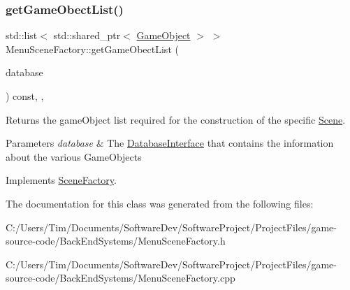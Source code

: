 \subsubsection{\texorpdfstring{get\+Game\+Obect\+List()}{getGameObectList()}}
{\footnotesize\ttfamily std\+::list$<$ std\+::shared\+\_\+ptr$<$ \hyperlink{class_game_object}{Game\+Object} $>$ $>$ Menu\+Scene\+Factory\+::get\+Game\+Obect\+List (\begin{DoxyParamCaption}\item[{std\+::shared\+\_\+ptr$<$ \hyperlink{class_database_interface}{Database\+Interface} $>$}]{database }\end{DoxyParamCaption}) const\hspace{0.3cm}{\ttfamily [final]}, {\ttfamily [protected]}, {\ttfamily [virtual]}}



Returns the game\+Object list required for the construction of the specific \hyperlink{class_scene}{Scene}. 


\begin{DoxyParams}{Parameters}
{\em database} & The \hyperlink{class_database_interface}{Database\+Interface} that contains the information about the various Game\+Objects \\
\hline
\end{DoxyParams}


Implements \hyperlink{class_scene_factory_a2c8541230e95df49d2ab39b7c6ecdb78}{Scene\+Factory}.



The documentation for this class was generated from the following files\+:\begin{DoxyCompactItemize}
\item 
C\+:/\+Users/\+Tim/\+Documents/\+Software\+Dev/\+Software\+Project/\+Project\+Files/game-\/source-\/code/\+Back\+End\+Systems/Menu\+Scene\+Factory.\+h\item 
C\+:/\+Users/\+Tim/\+Documents/\+Software\+Dev/\+Software\+Project/\+Project\+Files/game-\/source-\/code/\+Back\+End\+Systems/Menu\+Scene\+Factory.\+cpp\end{DoxyCompactItemize}
